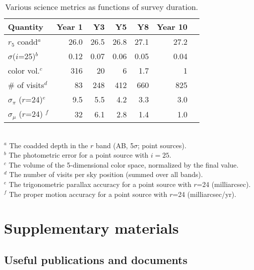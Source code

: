 \documentclass[DM,lsstdraft,toc,usenatbib]{lsstdoc}
\begin{document}
\begin{table}
\caption{Various science metrics as functions of survey duration.}
\begin{tabular}{|l|r|r|r|r|r|r|}
\hline     
          Quantity                          &     Year 1   &    Y3  &     Y5  &     Y8   &     Year 10   \\
\hline  
    $r_5$ coadd$^a$                   &       26.0    &      26.5   &      26.8    &      27.1    &          27.2     \\
    $\sigma$($i$=25)$^b$         &     0.12    &     0.07    &      0.06    &    0.05      &        0.04        \\     
    color vol.$^c$                        &       316     &       20     &        6      &    1.7        &           1       \\
     \# of visits$^d$                    &          83     &     248     &      412     &    660      &          825      \\  
    $\sigma_\pi$ ($r$=24)$^e$   &        9.5     &      5.5     &        4.2    &     3.3       &          3.0      \\ 
    $\sigma_\mu$ ($r$=24) $^f$  &  32   &      6.1    &     2.8   &     1.4   &     1.0     \\
\hline                         
\end{tabular}
\\ \vskip 0.05in
$^a$ The coadded depth in the $r$ band (AB, 5$\sigma$; point sources).  \\
$^b$ The photometric error for a point source with $i=25$. \\
$^c$ The volume of the 5-dimensional color space, normalized by the final value. \\
$^d$ The number of visits per sky position (summed over all bands). \\
$^e$ The trigonometric parallax accuracy for a point source with $r$=24 (milliarcsec). \\ 
$^f$  The proper motion accuracy for a point source with $r$=24 (milliarcsec/yr).  \\
\end{table}



\section{Supplementary materials} 
\label{append:supplemental}

\subsection{Useful publications and documents \label{sec:pubs}}
\end{document}
